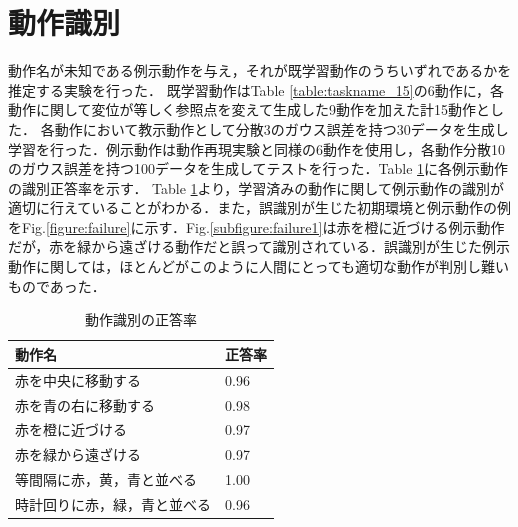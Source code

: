 \section{動作識別}

動作名が未知である例示動作を与え，それが既学習動作のうちいずれであるかを推定する実験を行った．
既学習動作はTable \ref{table:taskname_15}の6動作に，各動作に関して変位が等しく参照点を変えて生成した9動作を加えた計15動作とした．
各動作において教示動作として分散3のガウス誤差を持つ30データを生成し学習を行った．例示動作は動作再現実験と同様の6動作を使用し，各動作分散10のガウス誤差を持つ100データを生成してテストを行った．Table \ref{table:result}に各例示動作の識別正答率を示す．
Table \ref{table:result}より，学習済みの動作に関して例示動作の識別が適切に行えていることがわかる．また，誤識別が生じた初期環境と例示動作の例をFig.\ref{figure:failure}に示す．Fig.\ref{subfigure:failure1}は赤を橙に近づける例示動作だが，赤を緑から遠ざける動作だと誤って識別されている．誤識別が生じた例示動作に関しては，ほとんどがこのように人間にとっても適切な動作が判別し難いものであった．

\begin{table}[h]
	\caption{動作識別の正答率}
	\label{table:result}
	\centering
  	\begin{tabular}{|l|l|} \hline
    	動作名 & 正答率\\ \hline
   	赤を中央に移動する 		& 0.96
    	\\
    	赤を青の右に移動する 		& 0.98
    	\\
    	赤を橙に近づける 			& 0.97
    	\\
    	赤を緑から遠ざける 			& 0.97
    	\\
    	等間隔に赤，黄，青と並べる 	& 1.00
    	\\
    	時計回りに赤，緑，青と並べる 	& 0.96
    	\\ \hline
  	\end{tabular}
\end{table}


